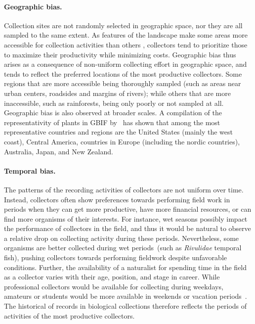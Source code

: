 \paragraph*{Geographic bias.}
Collection sites are not randomly selected in geographic space, nor they are all sampled to the same extent.
As features of the landscape make some areas more accessible for collection activities than others \cite{Hijmans2000}, collectors tend to prioritize those to maximize their productivity while minimizing costs.
Geographic bias thus arises as a consequence of non-uniform collecting effort in geographic space, and tends to reflect the preferred locations of the most productive collectors.
Some regions that are more accessible being thoroughly sampled (such as areas near urban centers, roadsides and margins of rivers);
while others that are more inaccessible, such as rainforests, being only poorly or not sampled at all.
%
Geographic bias is also observed at broader scales.
A compilation of the representativity of plants in GBIF by~ has shown that among the most representative countries and regions are the United States (mainly the west coast), Central America, countries in Europe (including the nordic countries), Australia, Japan, and New Zealand.


\paragraph*{Temporal bias.}
The patterns of the recording activities of collectors are not uniform over time.
Instead, collectors often show preferences towards performing field work in periods when they can get more productive, have more financial resources, or can find more organisms of their interests.
For instance, wet seasons possibly impact the performance of collectors in the field, and thus it would be natural to observe a relative drop on collecting activity during these periods.
Nevertheless, some organisms are better collected during wet periods~(such as \textit{Rivulidae} temporal fish), pushing collectors towards performing fieldwork despite unfavorable conditions.
Further, the availability of a naturalist for spending time in the field as a collector varies with their age, position, and stage in career.
While professional collectors would be available for collecting during weekdays, amateurs or students would be more available in weekends or vacation periods~\cite{Daru2017}.
The historical of records in biological collections therefore reflects the periods of activities of the most productive collectors.

